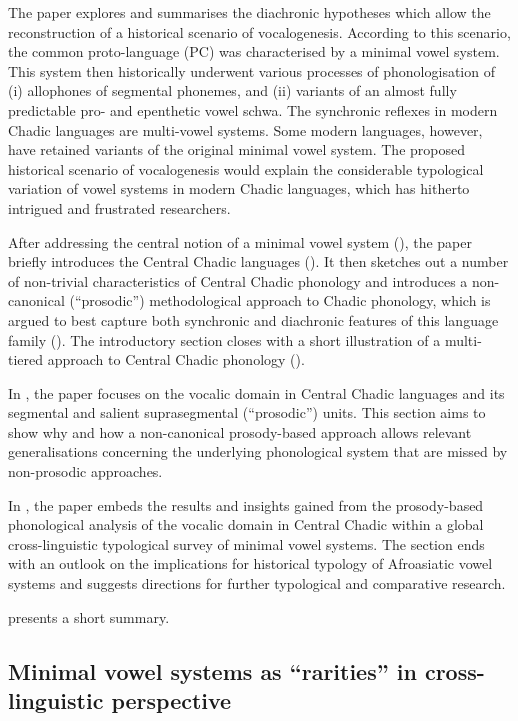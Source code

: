 \documentclass[output=paper]{langscibook}
\begin{document}
\begin{sloppypar}
The paper explores and summarises the diachronic hypotheses which allow the reconstruction of a historical scenario of vocalogenesis. According to this scenario, the common proto-language (PC) was characterised by a minimal vowel system. This system then historically underwent various processes of phonologisation of (i) allophones of segmental phonemes, and (ii) variants of an almost fully predictable pro- and epenthetic vowel schwa. The synchronic reflexes in modern Chadic languages are multi-vowel systems. Some modern languages, however, have retained variants of the original minimal vowel system. The proposed historical scenario of vocalogenesis would explain the considerable typological variation of vowel systems in modern Chadic languages, which has hitherto intrigued and frustrated researchers.
\end{sloppypar}

After addressing the central notion of a minimal vowel system (), the paper briefly introduces the Central Chadic languages (). It then sketches out a number of non-trivial characteristics of Central Chadic phonology and introduces a non-canonical (“prosodic”) methodological approach to Chadic phonology, which is argued to best capture both synchronic and diachronic features of this language family (). The introductory section closes with a short illustration of a multi-tiered approach to Central Chadic phonology ().

In , the paper focuses on the vocalic domain in Central Chadic languages and its segmental and salient suprasegmental (“prosodic”) units. This section aims to show why and how a non-canonical prosody-based approach allows relevant generalisations concerning the underlying phonological system that are missed by non-prosodic approaches. 

In , the paper embeds the results and insights gained from the prosody-based phonological analysis of the vocalic domain in Central Chadic within a global cross-linguistic typological survey of minimal vowel systems. The section ends with an outlook on the implications for historical typology of Afroasiatic vowel systems and suggests directions for further typological and comparative research.

 presents a short summary.

\subsection{Minimal vowel systems as ``rarities'' in cross-linguistic perspective}
\label{sec:Wolff:1.2}
\end{document}
